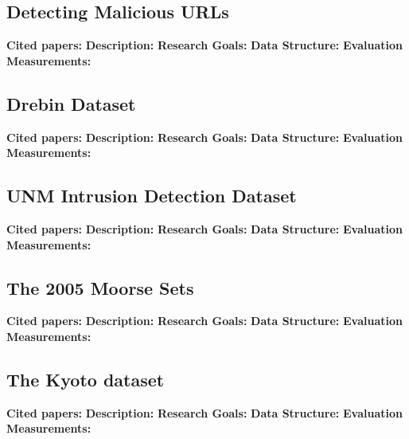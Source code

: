 \subsection{Detecting Malicious URLs}
\textbf{Cited papers:} \newline
\textbf{Description:} \newline
\textbf{Research Goals:}  \newline
\textbf{Data Structure:} \newline
\textbf{Evaluation Measurements:} \newline

\subsection{Drebin Dataset}
\textbf{Cited papers:} \newline
\textbf{Description:} \newline
\textbf{Research Goals:}  \newline
\textbf{Data Structure:} \newline
\textbf{Evaluation Measurements:} \newline

\subsection{UNM Intrusion Detection Dataset}
\textbf{Cited papers:} \newline
\textbf{Description:} \newline
\textbf{Research Goals:}  \newline
\textbf{Data Structure:} \newline
\textbf{Evaluation Measurements:} \newline

\subsection{The 2005 Moorse Sets}
\textbf{Cited papers:} \newline
\textbf{Description:} \newline
\textbf{Research Goals:}  \newline
\textbf{Data Structure:} \newline
\textbf{Evaluation Measurements:} \newline

\subsection{The Kyoto dataset}
\textbf{Cited papers:} \newline
\textbf{Description:} \newline
\textbf{Research Goals:}  \newline
\textbf{Data Structure:} \newline
\textbf{Evaluation Measurements:} \newline

